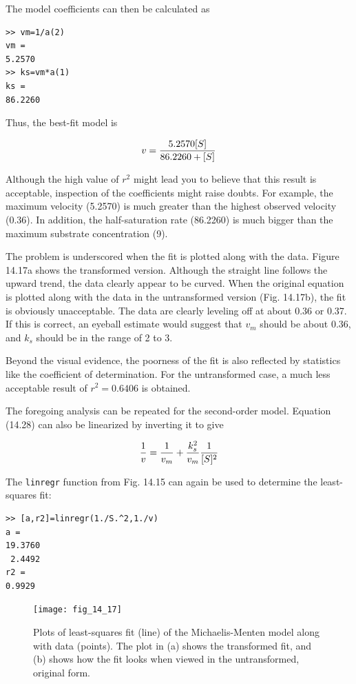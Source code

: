\documentclass[../main.tex]{subfiles}
\begin{document}
\noindent The model coefficients can then be calculated as

\begin{lstlisting}[numbers=none] 
>> vm=1/a(2)
vm =
5.2570
>> ks=vm*a(1)
ks =
86.2260
\end{lstlisting}

\noindent Thus, the best-fit model is

\begin{equation}
	\notag
	v = \frac{5.2570[S]}{86.2260 + [S]}
\end{equation}

Although the high value of $r^2$ might lead you to believe that this result is acceptable, inspection of the coefficients might raise doubts. For example, the maximum velocity (5.2570) is much greater than the highest observed velocity (0.36). In addition, the half-saturation rate (86.2260) is much bigger than the maximum substrate concentration (9).

The problem is underscored when the fit is plotted along with the data. Figure 14.17a shows the transformed version. Although the straight line follows the upward trend, the data clearly appear to be curved. When the original equation is plotted along with the data in the untransformed version (Fig. 14.17b), the fit is obviously unacceptable. The data are clearly leveling off at about 0.36 or 0.37. If this is correct, an eyeball estimate would suggest that $v_m$ should be about 0.36, and $k_s$ should be in the range of 2 to 3.

Beyond the visual evidence, the poorness of the fit is also reflected by statistics like the coefficient of determination. For the untransformed case, a much less acceptable result of $r^2 = 0.6406$ is obtained.


The foregoing analysis can be repeated for the second-order model. Equation (14.28) can also be linearized by inverting it to give

\begin{equation}
	\notag
	\frac{1}{v} = \frac{1}{v_m} + \frac{k^2_s}{v_m} \frac{1}{[S]^2}
\end{equation}

The \texttt{linregr} function from Fig. 14.15 can again be used to determine the least-squares fit:

\begin{lstlisting}[numbers=none] 
>> [a,r2]=linregr(1./S.^2,1./v)
a =
19.3760
 2.4492
r2 =
0.9929
\end{lstlisting}

\begin{figure}[H] 
	\centering
	\texttt{[image: fig\_14\_17]}
	\caption{\textsf{Plots of least-squares fit (line) of the Michaelis-Menten model along with data (points). The plot in (a) shows the transformed fit, and (b) shows how the fit looks when viewed in the untransformed, original form.}}
	\label{fig:fig_14_17}
\end{figure}
\end{document}
